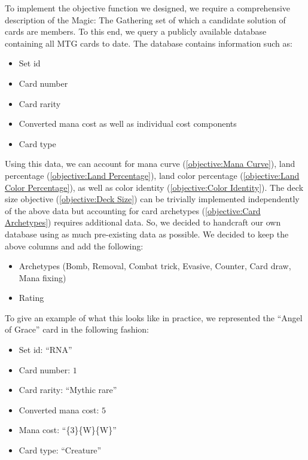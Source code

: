 \documentclass[12pt, letterpaper]{article}
\begin{document}
To implement the objective function we designed,
we require a comprehensive description of the Magic: The Gathering
set of which a candidate solution of cards are members.
To this end,
we query a publicly available database containing all MTG cards to date.
The database contains information such as:

\begin{itemize}
    \item Set id
    \item Card number
    \item Card rarity
    \item Converted mana cost as well as individual cost components
    \item Card type
\end{itemize}

Using this data,
we can account for mana curve (\ref{objective:Mana Curve}),
land percentage (\ref{objective:Land Percentage}),
land color percentage (\ref{objective:Land Color Percentage}),
as well as color identity (\ref{objective:Color Identity}).
The deck size objective (\ref{objective:Deck Size})
can be trivially implemented independently of the above data
but accounting for card archetypes (\ref{objective:Card Archetypes}) requires additional data.
So, we decided to handcraft our own database using as much pre-existing data as possible.
We decided to keep the above columns and add the following:

\begin{itemize}
    \item Archetypes (Bomb, Removal, Combat trick, Evasive, Counter, Card draw, Mana fixing)
    \item Rating
\end{itemize}

To give an example of what this looks like in practice,
we represented the \enquote{Angel of Grace} card in the following fashion:

\begin{itemize}
    \item Set id: \enquote{RNA}
    \item Card number: $ 1 $
    \item Card rarity: \enquote{Mythic rare}
    \item Converted mana cost: $ 5 $
    \item Mana cost: \enquote{\{3\}\{W\}\{W\}}
    \item Card type: \enquote{Creature}
\end{itemize}
\end{document}

